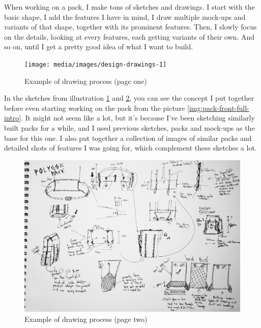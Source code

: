When working on a pack, I make tons of sketches and drawings. I start with the basic shape, I add the features I have in mind, I draw multiple mock-ups and variants of that shape, together with its prominent features. Then, I slowly focus on the details, looking at every features, each getting variants of their own. And so on, until I get a pretty good idea of what I want to build.

\begin{figure}[H]
  \texttt{[image: media/images/design-drawings-1]}
  \caption{Example of drawing process (page one)}
  \label{img:design-drawings-1}
\end{figure}

In the sketches from illustration \ref{img:design-drawings-1} and \ref{img:design-drawings-2}, you can see the concept I put together before even starting working on the pack from the picture \ref{img:pack-front-full-intro}. It might not seem like a lot, but it's because I've been sketching similarly built packs for a while, and I used previous sketches, packs and mock-ups as the base for this one. I also put together a collection of images of similar packs and detailed shots of features I was going for, which complement these sketches a lot.

\begin{figure}[H]
  \includegraphics[width=\textwidth]{media/images/design-drawings-2}
  \caption{Example of drawing process (page two)}
  \label{img:design-drawings-2}
\end{figure}

